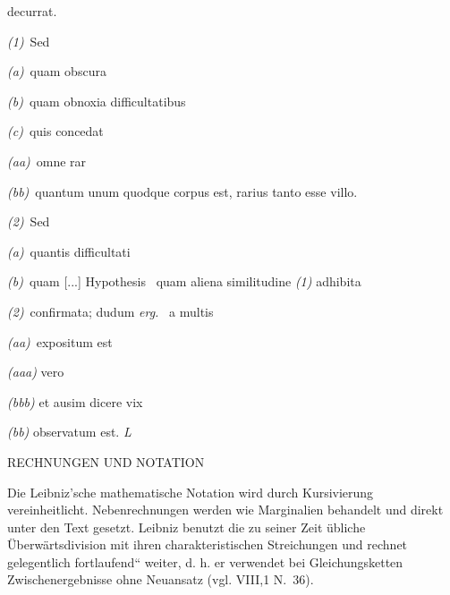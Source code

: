  decurrat.\par\noindent
\hspace{3mm}\textit{(1)}\ Sed\par\noindent
\hspace{8mm}\textit{(a)}\ quam obscura\par\noindent
\hspace{8mm}\textit{(b)}\ quam obnoxia difficultatibus\par\noindent
\hspace{8mm}\textit{(c)}\ quis concedat\par\noindent
\hspace{18mm}\textit{(aa)}\ omne rar\par\noindent
\hspace{18mm}\textit{(bb)}\ quantum unum quodque corpus est, rarius tanto esse villo.\par\noindent
\hspace{3mm}\textit{(2)}\ Sed\par\noindent
\hspace{8mm}\textit{(a)}\ quantis difficultati\par\noindent
\hspace{8mm}\textit{(b)}\ quam [...] Hypothesis \textbar\ quam aliena similitudine \textit{(1)} adhibita\par\noindent
\hspace{8.3cm}\textit{(2)}\ confirmata; dudum \textit{erg.} \textbar\ a
multis\par\noindent
\hspace{18mm}\textit{(aa)}\ expositum est\par\noindent
\hspace{23mm}\textit{(aaa)} vero\par\noindent
\hspace{23mm}\textit{(bbb)} et ausim dicere vix\par\noindent
\hspace{18mm}\textit{(bb)} observatum est. \textit{L}
\par\vspace{5.0ex}
\normalsize
\noindent\uppercase{Rechnungen und Notation}\par\vspace{1.0ex}
\noindent Die Leibniz'sche mathematische Notation wird durch Kursivierung verein\-heitlicht. Nebenrechnungen werden wie Marginalien behandelt und direkt unter den Text gesetzt. Leibniz benutzt die zu seiner Zeit \"{u}bliche \"{U}berw\"{a}rtsdivision mit ihren charakteristischen Streichungen und rechnet gelegentlich \glqq fortlaufend`` weiter, d. h. er verwendet bei Gleichungsketten Zwischenergebnisse ohne Neuansatz (vgl. VIII,1 N.~36).\par
